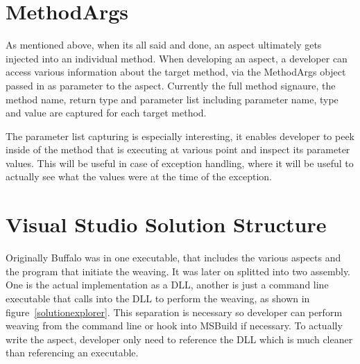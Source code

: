 \section{MethodArgs}

As mentioned above, when its all said and done, an aspect ultimately gets injected into an individual method. When developing an aspect, a developer can access various information about the target method, via the MethodArgs object passed in as parameter to the aspect. Currently the full method signaure, the method name, return type and parameter list including parameter name, type and value are captured for each target method.

The parameter list capturing is especially interesting, it enables developer to peek inside of the method that is executing at various point and inspect its parameter values. This will be useful in case of exception handling, where it will be useful to actually see what the values were at the time of the exception.

\section{Visual Studio Solution Structure}

Originally Buffalo was in one executable, that includes the various aspects and the program that initiate the weaving. It was later on splitted into two assembly. One is the actual implementation as a DLL, another is just a command line executable that calls into the DLL to perform the weaving, as shown in figure~\ref{solutionexplorer}. This separation is necessary so developer can perform weaving from the command line or hook into MSBuild if necessary. To actually write the aspect, developer only need to reference the DLL which is much cleaner than referencing an executable.

